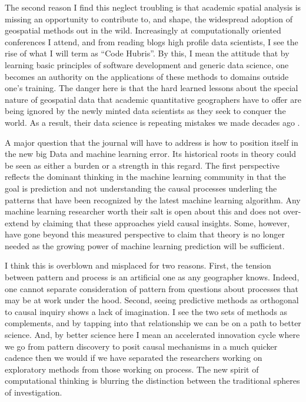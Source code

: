 \documentclass[11pt]{article}
\begin{document}
The second reason I find this neglect troubling is that academic spatial
analysis is missing an opportunity to contribute to, and shape, the widespread
adoption of geospatial methods out in the wild. Increasingly at computationally
oriented conferences I attend, and from reading blogs high profile data
scientists, I see the rise of what I will term as ``Code Hubris''. By this, I
mean the attitude that by learning basic principles of software development and
generic data science, one becomes an authority on the applications of these
methods to domains outside one's training. The danger here is that the hard
learned lessons about the special nature of geospatial data that academic
quantitative geographers have to offer are being ignored by the newly minted data
scientists as they seek to conquer the world. As a result, their data science is
repeating mistakes we made decades ago \cite{Arribas_Bel_2018}.

A major question that the journal will have to address is
how to position itself in the new big Data and machine learning error. Its
historical roots in theory \cite{Golledge_2010} could be seen as either a burden
or a strength in this regard. The first perspective reflects the dominant
thinking in the machine learning community in that the goal is prediction and
not understanding the causal processes underling the patterns that have been
recognized by the latest machine learning algorithm. Any machine learning
researcher worth their salt is open about this and does not over-extend by
claiming that these approaches yield causal insights. Some, however, have gone
beyond this measured perspective to claim that theory is no longer needed as the
growing power of machine learning prediction will be sufficient\cite{anserson_2006_eot}.

I think this is overblown and misplaced for two reasons. First, the tension
between pattern and process is an artificial one as any geographer knows. Indeed,
one cannot separate consideration of pattern from questions about processes that
may be at work under the hood. Second, seeing predictive methods as orthogonal
to causal inquiry shows a lack of imagination. I see the two sets of methods as
complements, and by tapping into that relationship we can be on a path to better
science. And, by better science here I mean an accelerated innovation cycle where we
go from pattern discovery to posit causal mechanisms in a much quicker cadence
then we would if we have separated the researchers working on exploratory
methods from those working on process. The new spirit of computational thinking
is blurring the distinction between the traditional spheres of investigation.
\end{document}
